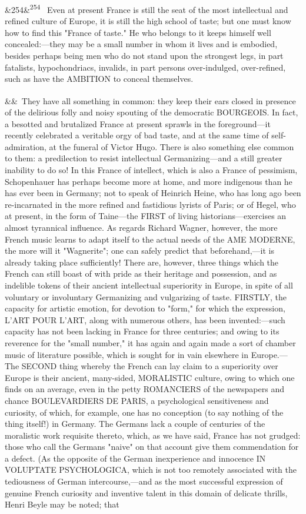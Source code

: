 \documentclass[12pt]{article}
\newcommand{\para}[1][]{\par\noindent\ifx&#1&\else\textsuperscript{\footnotesize #1}~\fi}
\begin{document}
\para[254] Even at present France is still the seat of the most intellectual and refined culture of Europe, it is still the high school of taste; but one must know how to find this "France of taste." He who belongs to it keeps himself well concealed:---they may be a small number in whom it lives and is embodied, besides perhaps being men who do not stand upon the strongest legs, in part fatalists, hypochondriacs, invalids, in part persons over-indulged, over-refined, such as have the AMBITION to conceal themselves.

\para They have all something in common: they keep their ears closed in presence of the delirious folly and noisy spouting of the democratic BOURGEOIS. In fact, a besotted and brutalized France at present sprawls in the foreground---it recently celebrated a veritable orgy of bad taste, and at the same time of self-admiration, at the funeral of Victor Hugo. There is also something else common to them: a predilection to resist intellectual Germanizing---and a still greater inability to do so! In this France of intellect, which is also a France of pessimism, Schopenhauer has perhaps become more at home, and more indigenous than he has ever been in Germany; not to speak of Heinrich Heine, who has long ago been re-incarnated in the more refined and fastidious lyrists of Paris; or of Hegel, who at present, in the form of Taine---the FIRST of living historians---exercises an almost tyrannical influence. As regards Richard Wagner, however, the more French music learns to adapt itself to the actual needs of the AME MODERNE, the more will it "Wagnerite"; one can safely predict that beforehand,---it is already taking place sufficiently! There are, however, three things which the French can still boast of with pride as their heritage and possession, and as indelible tokens of their ancient intellectual superiority in Europe, in spite of all voluntary or involuntary Germanizing and vulgarizing of taste. FIRSTLY, the capacity for artistic emotion, for devotion to "form," for which the expression, L'ART POUR L'ART, along with numerous others, has been invented:---such capacity has not been lacking in France for three centuries; and owing to its reverence for the "small number," it has again and again made a sort of chamber music of literature possible, which is sought for in vain elsewhere in Europe.---The SECOND thing whereby the French can lay claim to a superiority over Europe is their ancient, many-sided, MORALISTIC culture, owing to which one finds on an average, even in the petty ROMANCIERS of the newspapers and chance BOULEVARDIERS DE PARIS, a psychological sensitiveness and curiosity, of which, for example, one has no conception (to say nothing of the thing itself!) in Germany. The Germans lack a couple of centuries of the moralistic work requisite thereto, which, as we have said, France has not grudged: those who call the Germans "naive" on that account give them commendation for a defect. (As the opposite of the German inexperience and innocence IN VOLUPTATE PSYCHOLOGICA, which is not too remotely associated with the tediousness of German intercourse,---and as the most successful expression of genuine French curiosity and inventive talent in this domain of delicate thrills, Henri Beyle may be noted; that 
\end{document}
